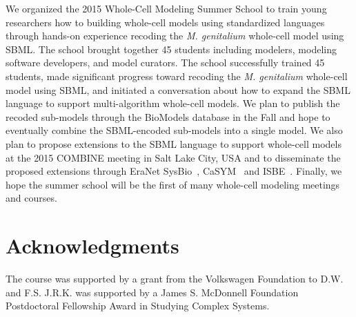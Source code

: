 \documentclass[journal,transmag]{IEEEtran}
\begin{document}
We organized the 2015 Whole-Cell Modeling Summer School to train young researchers how to building whole-cell models using standardized languages through hands-on experience recoding the \textit{M. genitalium} whole-cell model using SBML. 
The school brought together 45 students including modelers, modeling software developers, and model curators. 
The school successfully trained 45 students, made significant progress toward recoding the \textit{M. genitalium} whole-cell model using SBML, and initiated a conversation about how to expand the SBML language to support multi-algorithm whole-cell models. 
We plan to publish the recoded sub-models through the BioModels database in the Fall and hope to eventually combine the SBML-encoded sub-models into a single model. 
We also plan to propose extensions to the SBML language to support whole-cell models at the 2015 COMBINE meeting in Salt Lake City, USA and to disseminate the proposed extensions through EraNet SysBio~\cite{ERASysBio2015}, CaSYM~\cite{CaSYM2015} and ISBE~\cite{Wolkenhauer2009}.
Finally, we hope the summer school will be the first of many whole-cell modeling meetings and courses.

\section*{Acknowledgments}
The course was supported by a grant from the Volkswagen Foundation to D.W. and F.S. J.R.K. was supported by a James S. McDonnell Foundation Postdoctoral Fellowship Award in Studying Complex Systems.

\ifCLASSOPTIONcaptionsoff
  \newpage
\fi




% 
\end{document}
